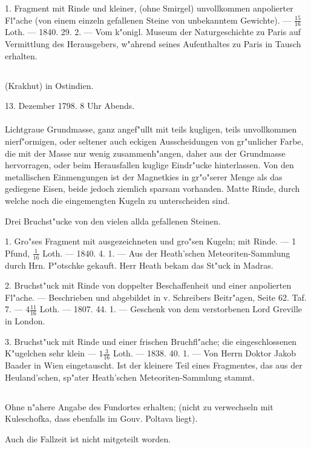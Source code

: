 \documentclass[a4paper, 11pt, oneside, polutonikogreek, german]{article}
\begin{document}
1. Fragment mit Rinde und kleiner, (ohne Smirgel) unvollkommen anpolierter Fl"ache (von einem einzeln gefallenen Steine von unbekanntem Gewichte). --- $\frac{15}{16}$ Loth. --- 1840. 29. 2. --- Vom k"onigl. Museum der Naturgeschichte zu Paris auf Vermittlung des Herausgebers, w"ahrend seines Aufenthaltes zu Paris in Tausch erhalten.
\subsection{}
\begin{center}

(Krakhut) in Ostindien.

13. Dezember 1798. 8 Uhr Abends.
\end{center}
\paragraph{}
Lichtgraue Grundmasse, ganz angef"ullt mit teils kugligen, teils unvollkommen nierf"ormigen, oder seltener auch eckigen Ausscheidungen von gr"unlicher Farbe, die mit der Masse nur wenig zusammenh"angen, daher aus der Grundmasse hervorragen, oder beim Herausfallen kuglige Eindr"ucke hinterlassen. Von den metallischen Einmengungen ist der Magnetkies in gr"o"serer Menge als das gediegene Eisen, beide jedoch ziemlich sparsam vorhanden. Matte Rinde, durch welche noch die eingemengten Kugeln zu unterscheiden sind.

Drei Bruchst"ucke von den vielen allda gefallenen Steinen.

1. Gro"ses Fragment mit ausgezeichneten und gro"sen Kugeln; mit Rinde. --- 1 Pfund, $\frac{1}{16}$ Loth. --- 1840. 4. 1. --- Aus der Heath'schen Meteoriten-Sammlung durch Hrn. P"otschke gekauft. Herr Heath bekam das St"uck in Madras.

2. Bruchst"uck mit Rinde von doppelter Beschaffenheit und einer anpolierten Fl"ache. --- Beschrieben und abgebildet in v. Schreibers Beitr"agen, Seite 62. Taf. 7. --- $4\frac{11}{16}$ Loth. --- 1807. 44. 1. --- Geschenk von dem verstorbenen Lord Greville in London.

3. Bruchst"uck mit Rinde und einer frischen Bruchfl"ache; die eingeschlossenen K"ugelchen sehr klein --- $1\frac{3}{16}$ Loth. --- 1838. 40. 1. --- Von Herrn Doktor Jakob Baader in Wien eingetauscht. Ist der kleinere Teil eines Fragmentes, das aus der Heuland'schen, sp"ater Heath'schen Meteoriten-Sammlung stammt.
\subsection{}
\begin{center}

Ohne n"ahere Angabe des Fundortes erhalten; (nicht zu verwechseln mit Kuleschofka, dass ebenfalls im Gouv. Poltava liegt).

Auch die Fallzeit ist nicht mitgeteilt worden.
\end{center}
\end{document}
